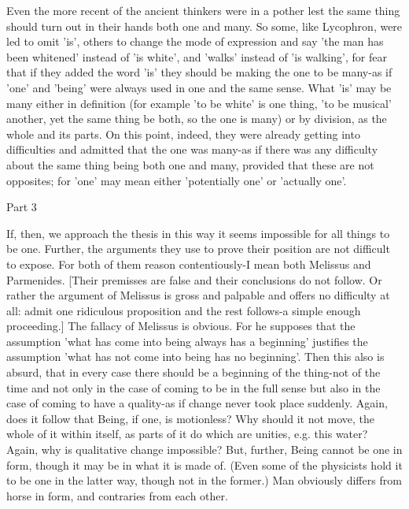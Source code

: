 Even the more recent of the ancient thinkers were in a pother lest
the same thing should turn out in their hands both one and many. So
some, like Lycophron, were led to omit 'is', others to change the
mode of expression and say 'the man has been whitened' instead of
'is white', and 'walks' instead of 'is walking', for fear that if
they added the word 'is' they should be making the one to be many-as
if 'one' and 'being' were always used in one and the same sense. What
'is' may be many either in definition (for example 'to be white' is
one thing, 'to be musical' another, yet the same thing be both, so
the one is many) or by division, as the whole and its parts. On this
point, indeed, they were already getting into difficulties and admitted
that the one was many-as if there was any difficulty about the same
thing being both one and many, provided that these are not opposites;
for 'one' may mean either 'potentially one' or 'actually one'.

Part 3

If, then, we approach the thesis in this way it seems impossible for
all things to be one. Further, the arguments they use to prove their
position are not difficult to expose. For both of them reason contentiously-I
mean both Melissus and Parmenides. [Their premisses are false and
their conclusions do not follow. Or rather the argument of Melissus
is gross and palpable and offers no difficulty at all: admit one ridiculous
proposition and the rest follows-a simple enough proceeding.] The
fallacy of Melissus is obvious. For he supposes that the assumption
'what has come into being always has a beginning' justifies the assumption
'what has not come into being has no beginning'. Then this also is
absurd, that in every case there should be a beginning of the thing-not
of the time and not only in the case of coming to be in the full sense
but also in the case of coming to have a quality-as if change never
took place suddenly. Again, does it follow that Being, if one, is
motionless? Why should it not move, the whole of it within itself,
as parts of it do which are unities, e.g. this water? Again, why is
qualitative change impossible? But, further, Being cannot be one in
form, though it may be in what it is made of. (Even some of the physicists
hold it to be one in the latter way, though not in the former.) Man
obviously differs from horse in form, and contraries from each other.


